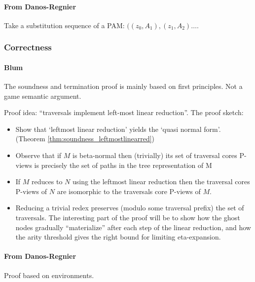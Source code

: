 \documentclass{article}
\theoremstyle{definition}
\begin{document}
\paragraph{From Danos-Regnier}

Take a substitution sequence of a PAM: $((z_0,A_1), (z_1,A_2) \ldots$.

\subsubsection{Correctness}
\paragraph{Blum}
The soundness and termination proof is mainly based on first principles. Not a game semantic argument.

Proof idea: ``traversals implement left-most linear reduction''.
The proof sketch:
\begin{itemize}
\item Show that `leftmost linear reduction' yields the `quasi normal form'.  (Theorem \ref{thm:soundness_leftmostlinearred})
\item Observe that if $M$ is beta-normal then (trivially) its set of traversal cores P-views is precisely the set of paths in the tree representation of M
\item If $M$ reduces to $N$ using the leftmost linear reduction then the traversal cores P-views of $N$ are isomorphic to the traversals core P-views of $M$.
\item Reducing a trivial redex preserves (modulo some traversal prefix) the set of traversals.
The interesting part of the proof will be to show how the ghost nodes gradually ``materialize'' after each step of the linear reduction, and how the arity threshold gives the right bound for limiting eta-expansion.
\end{itemize}

\paragraph{From Danos-Regnier}
Proof based on environments.



\end{document}
